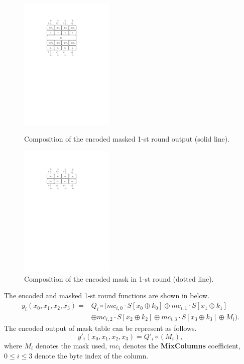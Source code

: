 \documentclass{beamer}
\begin{document}
\frame
{
	\begin{figure}
		\centering
		\begin{minipage}[b]{0.35\textwidth}
			\includegraphics[width=4.5cm]{./pics/DCA_comR12.pdf}
			\caption{Composition of the encoded masked 1-st round output (solid line).}
		\end{minipage}%
		\hspace{0.1\textwidth}%
		\begin{minipage}[b]{0.35\textwidth}
			\includegraphics[width=4.5cm]{./pics/DCA_comR12M.pdf}
			\caption{Composition of the encoded mask in 1-st round (dotted line).}
		\end{minipage}
	\end{figure}
}

\frame
{
	The encoded and masked 1-st round functions are shown in below.
	\[
	\begin{aligned}
	y_i(x_0,x_1,x_2,x_3)=&Q_i\circ(mc_{i,0}\cdot S[x_0\oplus k_0]\oplus mc_{i,1}\cdot S[x_1\oplus k_1]\\
	&\oplus mc_{i,2}\cdot S[x_2\oplus k_2]\oplus mc_{i,3}\cdot S[x_3\oplus k_3]\oplus M_i).
	\end{aligned}
	\]
	The encoded output of mask table can be represent as follows.
	\[y'_i(x_0,x_1,x_2,x_3)=Q'_i\circ(M_i),\]
	where $M_i$ denotes the mask used, $mc_i$ denotes the \textbf{MixColumns} coefficient, $0\leq i\leq 3$ denote the byte index of the column.
}
\end{document}
